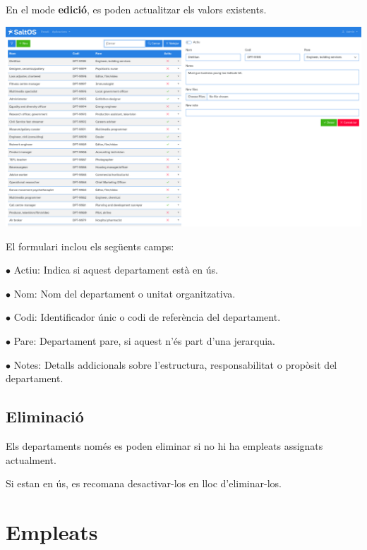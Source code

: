 \documentclass[a4paper]{article}
\begin{document}
En el mode \textbf{edició}, es poden actualitzar els valors existents.

\begin{center}\includegraphics[width=1\textwidth]{../ujest/snaps/test-screenshots-js-screenshots-hr-departments-edit-100-ca-es-1-snap.png}\end{center}

El formulari inclou els següents camps:

\begin{compactitem}
\item[\color{myblue}$\bullet$] Actiu: Indica si aquest departament està en ús.
\item[\color{myblue}$\bullet$] Nom: Nom del departament o unitat organitzativa.
\item[\color{myblue}$\bullet$] Codi: Identificador únic o codi de referència del departament.
\item[\color{myblue}$\bullet$] Pare: Departament pare, si aquest n'és part d'una jerarquia.
\item[\color{myblue}$\bullet$] Notes: Detalls addicionals sobre l'estructura, responsabilitat o propòsit del departament.
\end{compactitem}

\hypertarget{toc105}{}
\subsection{Eliminació}

Els departaments només es poden eliminar si no hi ha empleats assignats actualment.

Si estan en ús, es recomana desactivar-los en lloc d'eliminar-los.


\hypertarget{toc106}{}
\section{Empleats}
\end{document}
